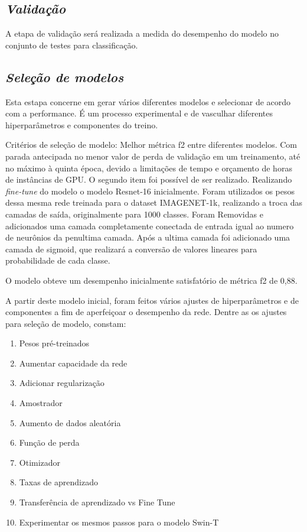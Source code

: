 \subsection{\textit{Validação}}\label{sec:Cap3_Validacao}

A etapa de validação será realizada a medida do desempenho do modelo no conjunto de testes para classificação.

\subsection{\textit{Seleção de modelos}}\label{sec:Cap3_SelecaoModelos}

Esta estapa concerne em gerar vários diferentes modelos e selecionar de acordo com a performance. É um processo experimental e de vasculhar diferentes hiperparâmetros e componentes do treino.



Critérios de seleção de modelo:
Melhor métrica f2 entre diferentes modelos. Com parada antecipada no menor valor de perda de validação em um treinamento, até no máximo à quinta época, devido a limitações de tempo e orçamento de horas de instâncias de GPU.
O segundo item foi possível de ser realizado. Realizando \textit{fine-tune} do modelo o modelo Resnet-16 inicialmente. Foram utilizados os pesos dessa mesma rede treinada para o dataset IMAGENET-1k, realizando a troca das camadas de saída, originalmente para 1000 classes. Foram Removidas e adicionados uma camada completamente conectada de entrada igual ao numero de neurônios da penultima camada. Após a ultima camada foi adicionado uma camada de sigmoid, que realizará a conversão de valores lineares para probabilidade de cada classe.

O modelo obteve um desempenho inicialmente satisfatório de métrica f2 de 0,88.

A partir deste modelo inicial, foram feitos vários ajustes de hiperparâmetros e de componentes a fim de aperfeiçoar o desempenho da rede. Dentre as os ajustes para seleção de modelo, constam:


\begin{enumerate}
    \item Pesos pré-treinados
    \item Aumentar capacidade da rede
    \item Adicionar regularização 
    \item Amostrador
    \item Aumento de dados aleatória
    \item Função de perda
    \item Otimizador
    \item Taxas de aprendizado
    \item Transferência de aprendizado vs Fine Tune
    \item Experimentar os mesmos passos para o modelo Swin-T
\end{enumerate}

